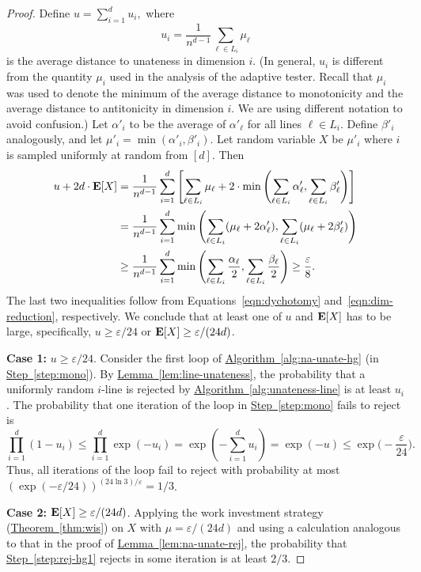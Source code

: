 \documentclass[11pt]{article}
\numberwithin{equation}{section}
\theoremstyle{definition}
\theoremstyle{plain}
\newcommand{\expref}[2]{\hyperref[#2]{#1~\ref{#2}}}
\newcommand{\eps}{\varepsilon}
\DeclareMathOperator{\E}{\hbox{\bf E}}
\newcommand{\Alg}[1]{\expref{Algorithm}{alg:#1}}
\newcommand{\Thm}[1]{\expref{Theorem}{thm:#1}}
\newcommand{\Lem}[1]{\expref{Lemma}{lem:#1}}
\newcommand{\Step}[1]{\expref{Step}{step:#1}}
\begin{document}
\begin{proof}
Define $u=\sum_{i=1}^d u_i,$ where
\[
  u_i= \frac{1}{n^{d-1}}\sum_{\ell \in L_i} \mu_\ell
\]
is the average distance to unateness in dimension $i$. (In general,
$u_i$ is different from the quantity $\mu_i$ used in the analysis of
the adaptive tester. Recall that $\mu_i$ was used to denote the
minimum of the average distance to monotonicity and the average
distance to 
%
%
antitonicity %
in dimension $i$. We are using different
notation to avoid confusion.)  Let $\alpha'_i$ to be the average of
$\alpha'_\ell$ for all lines $\ell\in L_i$. Define $\beta'_i$
analogously, and let $\mu'_i=\min(\alpha'_i,\beta'_i)$. Let random
variable $X$ be $\mu'_i$ where $i$ is sampled uniformly at random from
$[d]$.  Then
\begin{align*}
u+2d\cdot\E[X]
&=	\frac{1}{n^{d-1}}\sum_{i=1}^d  \left[\sum_{\ell \in L_i} \mu_\ell + 2\cdot\min\left(\sum_{\ell \in L_i} \alpha'_\ell, \sum_{\ell \in L_i} \beta'_\ell \right)\right]  \\
	&= \frac{1}{n^{d-1}}\sum_{i=1}^d  \min\left(\sum_{\ell \in L_i} (\mu_\ell + 2\alpha'_\ell), \sum_{\ell \in L_i} (\mu_\ell + 2\beta'_\ell) \right)\\
&\geq \frac{1}{n^{d-1}}\sum_{i=1}^d  \min\left(\sum_{\ell \in L_i} \frac{\alpha_\ell}2, \sum_{\ell \in L_i} \frac{\beta_\ell}2 \right)
\geq \frac{\eps}8.
	\end{align*}
The last two inequalities follow from Equations~\eqref{eqn:dychotomy}
and~\eqref{eqn:dim-reduction}, respectively.
%
%
We conclude that at least one of $u$ and $\E[X]$ has to be
large, %
specifically, $u \geq \eps/{24}$ or $\E[X]\geq \eps/{(24d)}$.
	
{\bf Case 1:} $u\geq \eps/{24}$. Consider the first loop of \Alg{na-unate-hg} (in \Step{mono}). By \Lem{line-unateness}, the probability that a uniformly random $i$-line is rejected by \Alg{unateness-line} is at least $u_i$. The probability that one iteration of the loop in \Step{mono} fails to reject is
\[\prod_{i=1}^d (1-u_i)
\leq \prod_{i=1}^d \exp(-u_i)
=\exp(-\sum_{i=1}^d u_i)
=\exp(-u)\leq \exp \big(-\frac \eps {24}\big).
\]
Thus, all iterations of the loop fail to reject with probability at most $(\exp(-\eps/24))^{(24\ln 3)/\eps}=1/3$.

{\bf Case 2:} $\E[X]\geq \eps/{(24d)}$.
Applying the work investment strategy (\Thm{wis}) on $X$ with $\mu=\eps/{(24d)}$ and using a calculation analogous to that in the proof of \Lem{na-unate-rej},
the probability that \Step{rej-hg1} rejects in some iteration is at least
$2/3$.
\end{proof}
\end{document}
